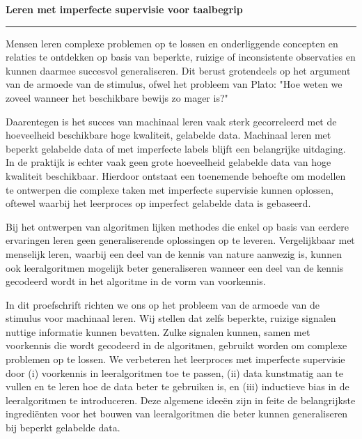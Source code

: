 \samenvatting
\vspace{-30pt}
\textbf{Leren met imperfecte supervisie voor taalbegrip} 
\vspace{-10pt}\par\noindent\rule{\textwidth}{0.4pt}

Mensen leren complexe problemen op te lossen en onderliggende concepten en relaties te ontdekken op basis van beperkte, ruizige of inconsistente observaties en kunnen daarmee succesvol generaliseren.
Dit berust grotendeels op het argument van de armoede van de stimulus, ofwel het probleem van Plato: "Hoe weten we zoveel wanneer het beschikbare bewijs zo mager is?"

Daarentegen is het succes van machinaal leren vaak sterk gecorreleerd met de hoeveelheid beschikbare hoge kwaliteit, gelabelde data. Machinaal leren met beperkt gelabelde data of met imperfecte labels blijft een belangrijke uitdaging.
In de praktijk is echter vaak geen grote hoeveelheid gelabelde data van hoge kwaliteit beschikbaar.
Hierdoor ontstaat een toenemende behoefte om modellen te ontwerpen die complexe taken met imperfecte supervisie kunnen oplossen, oftewel waarbij het leerproces op imperfect gelabelde data is gebaseerd.

Bij het ontwerpen van algoritmen lijken methodes die enkel op basis van eerdere ervaringen leren geen generaliserende oplossingen op te leveren.
Vergelijkbaar met menselijk leren, waarbij een deel van de kennis van nature aanwezig is, kunnen ook leeralgoritmen mogelijk beter generaliseren wanneer een deel van de kennis gecodeerd wordt in het algoritme in de vorm van voorkennis.

In dit proefschrift richten we ons op het probleem van de armoede van de stimulus voor machinaal leren.
Wij stellen dat zelfs beperkte, ruizige signalen nuttige informatie kunnen bevatten.
Zulke signalen kunnen, samen met voorkennis die wordt gecodeerd in de algoritmen, gebruikt worden om complexe problemen op te lossen.
We verbeteren het leerproces met imperfecte supervisie door (i) voorkennis in leeralgoritmen toe te passen, (ii) data kunstmatig aan te vullen en te leren hoe de data beter te gebruiken is, en (iii) inductieve bias in de leeralgoritmen te introduceren.
Deze algemene ideeën zijn in feite de belangrijkste ingrediënten voor het bouwen van leeralgoritmen die beter kunnen generaliseren bij beperkt gelabelde data.

